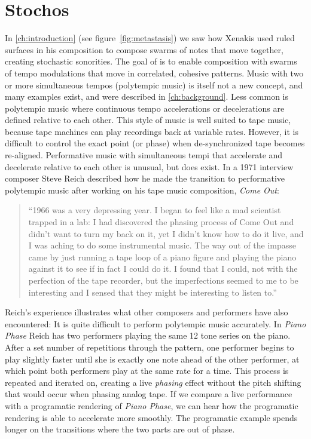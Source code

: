 \section{Stochos}
\label{sec:polytempic-stochos}
In \autoref{ch:introduction} (see figure~\ref{fig:metastasis}) we saw
how Xenakis used ruled surfaces in his composition to compose swarms
of notes that move together, creating stochastic sonorities. The goal
of \polytempic is to enable composition with swarms of tempo
modulations that move in correlated, cohesive patterns. Music with two
or more simultaneous tempos (polytempic music) is itself not a new
concept, and many examples exist,\cite{Greschak2003} and were
described in \autoref{ch:background}. Less common is polytempic music
where continuous tempo accelerations or decelerations are defined
relative to each other. This style of music is well suited to tape
music, because tape machines can play recordings back at variable
rates. However, it is difficult to control the exact point (or phase)
when de-synchronized tape becomes re-aligned. Performative music with
simultaneous tempi that accelerate and decelerate relative to each
other is unusual, but does exist. In a 1971 interview composer Steve
Reich described how he made the transition to performative polytempic
music after working on his tape music composition, \textit{Come Out}:
\begin{quotation}
  ``1966 was a very depressing year. I began to feel like a mad
  scientist trapped in a lab: I had discovered the phasing process
  of Come Out and didn't want to turn my back on it, yet I didn't know
  how to do it live, and I was aching to do some instrumental
  music. The way out of the impasse came by just running a tape loop
  of a piano figure and playing the piano against it to see if in fact
  I could do it. I found that I could, not with the perfection of the
  tape recorder, but the imperfections seemed to me to be interesting
  and I sensed that they might be interesting to listen to.''\cite{Nyman2015}
\end{quotation}
Reich's experience illustrates what other composers and performers
have also encountered: It is quite difficult to perform polytempic
music accurately. In \textit{Piano Phase} Reich has two performers
playing the same 12 tone series on the piano. After a set number of
repetitions through the pattern, one performer begins to play slightly
faster until she is exactly one note ahead of the other performer, at
which point both performers play at the same rate for a time. This
process is repeated and iterated on, creating a live \emph{phasing}
effect without the pitch shifting that would occur when phasing analog
tape. If we compare a live performance\cite{Huisman1989} with a
programatic rendering\cite{Chen2014} of \textit{Piano Phase}, we can
hear how the programatic rendering is able to accelerate more
smoothly. The programatic example spends longer on the transitions
where the two parts are out of phase.

